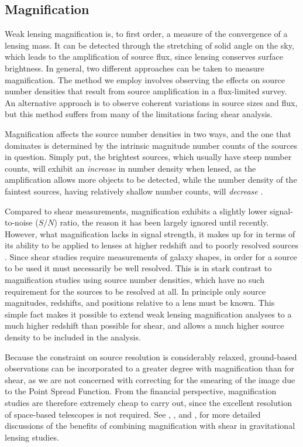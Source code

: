 \subsection{Magnification}
\label{sec:Mag}
Weak lensing magnification is, to first order, a measure of the convergence of a lensing mass.  It can be detected through the stretching of solid angle on the sky, which leads to the amplification of source flux, since lensing conserves surface brightness. In general, two different approaches can be taken to measure magnification.  The method we employ involves observing the effects on source number densities that result from source amplification in a flux-limited survey. An alternative approach is to observe coherent variations in source sizes and flux, but this method suffers from many of the limitations facing shear analysis.

Magnification affects the source number densities in two ways, and the one that dominates is determined by the intrinsic magnitude number counts of the sources in question.  Simply put, the brightest sources, which usually have steep number counts, will exhibit an {\it increase} in number density when lensed, as the amplification allows more objects to be detected, while the number density of the faintest sources, having relatively shallow number counts, will {\it decrease} \citep{Narayan89}.

Compared to shear measurements, magnification exhibits a slightly lower signal-to-noise ($S/N$) ratio, the reason it has been largely ignored until recently.  However, what magnification lacks in signal strength, it makes up for in terms of its ability to be applied to lenses at higher redshift and to poorly resolved sources \citep{Waerbeke10}.  Since shear studies require measurements of galaxy shapes, in order for a source to be used it must necessarily be well resolved.  This is in stark contrast to magnification studies using source number densities, which have no such requirement for the sources to be resolved at all.  In principle only source magnitudes, redshifts, and positions relative to a lens must be known.  This simple fact makes it possible to extend weak lensing magnification analyses to a much higher redshift than possible for shear, and allows a much higher source density to be included in the analysis.  

Because the constraint on source resolution is considerably relaxed, ground-based observations can be incorporated to a greater degree with magnification than for shear, as we are not concerned with correcting for the smearing of the image due to the Point Spread Function. From the financial perspective, magnification studies are therefore extremely cheap to carry out, since the excellent resolution of space-based telescopes is not required. See \citet{Waerbeke10}, \citet{RozoSchmidt10}, and \citet{Umetsu11}, for more detailed discussions of the benefits of combining magnification with shear in gravitational lensing studies.

